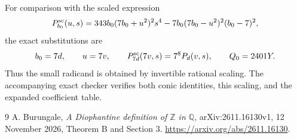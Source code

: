 \documentclass[11pt,a4paper]{article}
\newcommand{\Q}{\mathbb Q}
\newcommand{\Z}{\mathbb Z}
\begin{document}
For comparison with the scaled expression
\[
 P^{\rm sc}_{b_0}(u,s)=343b_0(7b_0+u^2)^2s^4
             -7b_0(7b_0-u^2)^2(b_0-7)^2,
\]
the exact substitutions are
\[
 b_0=7d,\qquad u=7v,\qquad
 P^{\rm sc}_{7d}(7v,s)=7^8P_d(v,s),\qquad Q_0=2401Y.
\]
Thus the small radicand is obtained by invertible rational scaling.
The accompanying exact checker verifies both conic identities, this
scaling, and the expanded coefficient table.

\begin{thebibliography}{9}
A. Burungale, \emph{A Diophantine definition of $\Z$ in $\Q$},
arXiv:2611.16130v1, 12 November 2026, Theorem B and Section 3.
\url{https://arxiv.org/abs/2611.16130}.
\end{thebibliography}
\end{document}
